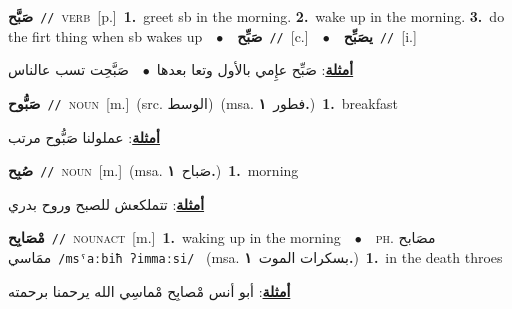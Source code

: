 \documentclass[10pt,a4paper,twoside]{article} %
\begin{document}
\begin{multicols}{2}
{\setlength\topsep{0pt}\textbf{\foreignlanguage{arabic}{صَبَّح}}\ {\color{gray}\texttt{//}\color{black}}\ \textsc{verb}\ [p.]\ \textbf{1.}~greet sb in the morning.  \textbf{2.}~wake up in the morning.  \textbf{3.}~do the firt thing when sb wakes up\ \ $\bullet$\ \ \setlength\topsep{0pt}\textbf{\foreignlanguage{arabic}{صَبِّح}}\ {\color{gray}\texttt{//}\color{black}}\ [c.]\ \ $\bullet$\ \ \setlength\topsep{0pt}\textbf{\foreignlanguage{arabic}{يصَبِّح}}\ {\color{gray}\texttt{//}\color{black}}\ [i.]\  \begin{flushright}\color{gray}\foreignlanguage{arabic}{\textbf{\underline{\foreignlanguage{arabic}{أمثلة}}}: صَبِّح عإِمي بالأول وتعا بعدها\ $\bullet$\ \  صَبَّحِت تسب عالناس}\end{flushright}\color{black}} \vspace{2mm}

{\setlength\topsep{0pt}\textbf{\foreignlanguage{arabic}{صَبُّوح}}\ {\color{gray}\texttt{//}\color{black}}\ \textsc{noun}\ [m.]\ (src. \color{gray}\foreignlanguage{arabic}{الوسط}\color{black})\ \color{gray}(msa. \foreignlanguage{arabic}{فطور}~\foreignlanguage{arabic}{\textbf{١.}})\color{black}\ \textbf{1.}~breakfast\  \begin{flushright}\color{gray}\foreignlanguage{arabic}{\textbf{\underline{\foreignlanguage{arabic}{أمثلة}}}: عملولنا صَبُّوح  مرتب}\end{flushright}\color{black}} \vspace{2mm}

{\setlength\topsep{0pt}\textbf{\foreignlanguage{arabic}{صُبِح}}\ {\color{gray}\texttt{//}\color{black}}\ \textsc{noun}\ [m.]\ \color{gray}(msa. \foreignlanguage{arabic}{صَباح}~\foreignlanguage{arabic}{\textbf{١.}})\color{black}\ \textbf{1.}~morning\  \begin{flushright}\color{gray}\foreignlanguage{arabic}{\textbf{\underline{\foreignlanguage{arabic}{أمثلة}}}: تتملكعش للصبح وروح بدري}\end{flushright}\color{black}} \vspace{2mm}

{\setlength\topsep{0pt}\textbf{\foreignlanguage{arabic}{مْصَابِح}}\ {\color{gray}\texttt{//}\color{black}}\ \textsc{noun\textunderscore act}\ [m.]\ \textbf{1.}~waking up in the morning\ \ $\bullet$\ \ \textsc{ph.} \color{gray} \foreignlanguage{arabic}{مصَابح ممَاسي}\color{black}\ {\color{gray}\texttt{/{\sffamily msˤaːbiħ ʔimmaːsi}/}\color{black}}\ \color{gray} (msa. \foreignlanguage{arabic}{بسكرات الموت}~\foreignlanguage{arabic}{\textbf{١.}})\color{black}\ \textbf{1.}~in the death throes\  \begin{flushright}\color{gray}\foreignlanguage{arabic}{\textbf{\underline{\foreignlanguage{arabic}{أمثلة}}}: أبو أنس مْصابِح مْماسِي الله يرحمنا برحمته}\end{flushright}\color{black}} \vspace{2mm}


\end{multicols}
\end{document}
